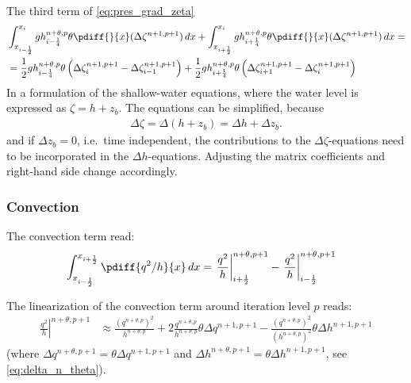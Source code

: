 The third term of \autoref{eq:pres_grad_zeta}
\begin{align}
    &\int_{x_{i-\half}}^{x_{i}} g h^{n+\theta,p}_{i-\quart} \theta \pdiff{}{x} (\Delta \zeta^{n+1, p+1}) \,dx
    + \int_{x_{i+\half}}^{x_{i}} g h^{n+\theta,p}_{i+\quart} \theta \pdiff{}{x} (\Delta \zeta^{n+1, p+1}) \,dx =
    \\
    & = \half g h^{n+\theta,p}_{i-\quart}\theta
    \left( \Delta\zeta^{n+1,p+1}_{i}- \Delta\zeta^{n+1,p+1}_{i-1} \right) +
    \half g h^{n+\theta,p}_{i+\quart}
    \theta\left( \Delta\zeta^{n+1,p+1}_{i+1} - \Delta\zeta^{n+1,p+1}_{i} \right)
\end{align}
In a formulation of the shallow-water equations, where the water level is expressed as $\zeta = h + z_b$.
The equations can be simplified, because
\begin{align}
    \Delta \zeta = \Delta (h + z_b) = \Delta h + \Delta z_b.
\end{align}
and if $\Delta z_b=0$, i.e.\ time independent, the contributions to the $\Delta \zeta$-equations need to be incorporated in the $\Delta h$-equations.
Adjusting the matrix coefficients and right-hand side change accordingly.
\subsubsection{Convection}
The convection term read:
\begin{align}
    &  \int_{x_{i-\half}}^{x_{i+\half}} \pdiff{q^2/h}{x} \,dx
    = \left. \frac{q^2}{h}\right|^{n+\theta, p+1}_{i+\half}
    - \left. \frac{q^2}{h}\right|^{n+\theta, p+1}_{i-\half}
\end{align}

The linearization of the convection term around iteration level $p$ reads:
\begin{align}
    \left. \frac{q^2}{h}\right|^{n+\theta, p+1}
    &\approx
    \frac{(q^{n+\theta,p})^2}{h^{n+\theta,p}} +
    2 \frac{q^{n+\theta,p}}{h^{n+\theta,p}} \theta \Delta q^{n+1,p+1}
    - \frac{(q^{n+\theta,p})^2}{(h^{n+\theta,p})^2}  \theta \Delta h^{n+1,p+1}
\end{align}
(where $\Delta q^{n+\theta,p+1} = \theta \Delta q^{n+1,p+1}$ and $\Delta h^{n+\theta,p+1} = \theta \Delta h^{n+1,p+1}$, see \autoref{eq:delta_n_theta}).
